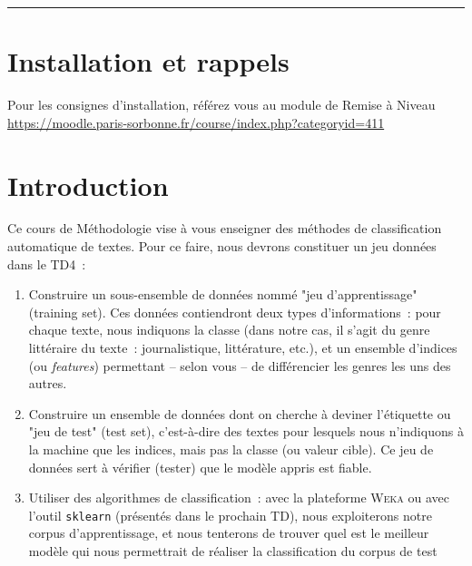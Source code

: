 
\newcommand{\numTD}{TD3}
\newcommand{\themeTD}{Lire des textes avec la machine}



\hrule

\section*{Installation et rappels}

 Pour les consignes d'installation, référez vous au module de Remise à Niveau \url{https://moodle.paris-sorbonne.fr/course/index.php?categoryid=411}

\section*{Introduction}

 Ce cours de Méthodologie vise à vous enseigner des méthodes de classification automatique de textes. Pour ce faire, nous devrons constituer un jeu données dans le TD4 :

\begin{enumerate}
  \item  Construire un sous-ensemble de données nommé "jeu d'apprentissage" (training set). Ces données contiendront deux types d'informations : pour chaque texte, nous indiquons la classe (dans notre cas, il s'agit du genre littéraire du texte : journalistique, littérature, etc.), et un ensemble d'indices (ou \textit{features}) permettant – selon vous – de différencier les genres les uns des autres.
  \item  Construire un ensemble de données dont on cherche à deviner l'étiquette ou "jeu de test" (test set), c'est-à-dire des textes pour lesquels nous n'indiquons à la machine que les indices, mais pas la classe (ou valeur cible). Ce jeu de données sert à vérifier (tester) que le modèle appris est fiable.
  \item  Utiliser des algorithmes de classification : avec la plateforme \textsc{Weka} ou avec l'outil \texttt{sklearn} (présentés dans le prochain TD), nous exploiterons notre corpus d'apprentissage, et nous tenterons de trouver quel est le meilleur modèle qui nous permettrait de réaliser la classification du corpus de test
\end{enumerate}

